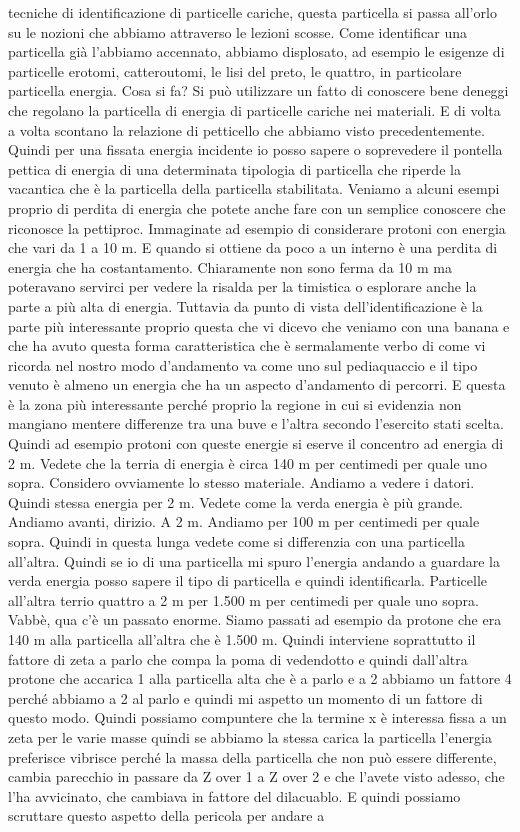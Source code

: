 tecniche di identificazione di particelle cariche, questa particella si passa all'orlo su le nozioni che abbiamo attraverso le lezioni scosse. Come identificar una particella già l'abbiamo accennato, abbiamo displosato, ad esempio le esigenze di particelle erotomi, catteroutomi, le lisi del preto, le quattro, in particolare particella energia. Cosa si fa? Si può utilizzare un fatto di conoscere bene deneggi che regolano la particella di energia di particelle cariche nei materiali. E di volta a volta scontano la relazione di petticello che abbiamo visto precedentemente. Quindi per una fissata energia incidente io posso sapere o soprevedere il pontella pettica di energia di una determinata tipologia di particella che riperde la vacantica che è la particella della particella stabilitata. Veniamo a alcuni esempi proprio di perdita di energia che potete anche fare con un semplice conoscere che riconosce la pettiproc. Immaginate ad esempio di considerare protoni con energia che vari da 1 a 10 m. E quando si ottiene da poco a un interno è una perdita di energia che ha costantamento. Chiaramente non sono ferma da 10 m ma poteravano servirci per vedere la risalda per la timistica o esplorare anche la parte a più alta di energia. Tuttavia da punto di vista dell'identificazione è la parte più interessante proprio questa che vi dicevo che veniamo con una banana e che ha avuto questa forma caratteristica che è sermalamente verbo di come vi ricorda nel nostro modo d'andamento va come uno sul pediaquaccio e il tipo venuto è almeno un energia che ha un aspecto d'andamento di percorri. E questa è la zona più interessante perché proprio la regione in cui si evidenzia non mangiano mentere differenze tra una buve e l'altra secondo l'esercito stati scelta. Quindi ad esempio protoni con queste energie si eserve il concentro ad energia di 2 m. Vedete che la terria di energia è circa 140 m per centimedi per quale uno sopra. Considero ovviamente lo stesso materiale. Andiamo a vedere i datori. Quindi stessa energia per 2 m. Vedete come la verda energia è più grande. Andiamo avanti, dirizio. A 2 m. Andiamo per 100 m per centimedi per quale sopra. Quindi in questa lunga vedete come si differenzia con una particella all'altra. Quindi se io di una particella mi spuro l'energia andando a guardare la verda energia posso sapere il tipo di particella e quindi identificarla. Particelle all'altra terrio quattro a 2 m per 1.500 m per centimedi per quale uno sopra. Vabbè, qua c'è un passato enorme. Siamo passati ad esempio da protone che era 140 m alla particella all'altra che è 1.500 m. Quindi interviene soprattutto il fattore di zeta a parlo che compa la poma di vedendotto e quindi dall'altra protone che accarica 1 alla particella alta che è a parlo e a 2 abbiamo un fattore 4 perché abbiamo a 2 al parlo e quindi mi aspetto un momento di un fattore di questo modo. Quindi possiamo compuntere che la termine x è interessa fissa a un zeta per le varie masse quindi se abbiamo la stessa carica la particella l'energia preferisce vibrisce perché la massa della particella che non può essere differente, cambia parecchio in passare da Z over 1 a Z over 2 e che l'avete visto adesso, che l'ha avvicinato, che cambiava in fattore del dilacuablo. E quindi possiamo scruttare questo aspetto della pericola per andare a 